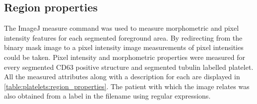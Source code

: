\subsection{Region properties}
\label{platelets:morphometric_measurements}
The ImageJ measure command was used to measure morphometric and pixel intensity features for each segmented foreground area. By redirecting from the binary mask image to a pixel intensity image measurements of pixel intensities could be taken. Pixel intensity and morphometric properties were measured for every segmented CD63 positive structure and segmented tubulin labelled platelet. All the measured attributes along with a description for each are displayed in \autoref{table:platelets:region_properties}. The patient with which the image relates was also obtained from a label in the filename using regular expressions.

